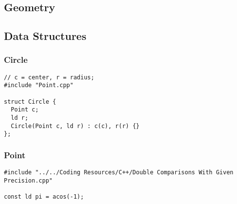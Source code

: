 \documentclass[twoside]{article}
\begin{document}
\begin{multicols*}{2}
\sectionfont{\bfseries\sffamily\centering\Huge}
\vspace{1em}
\section*{Geometry}
\vspace{3em}
\subsectionfont{\bfseries\sffamily\centering\LARGE}
\vspace{0em}
\subsection*{Data Structures}
\vspace{2em}
\subsubsectionfont{\large\bfseries\sffamily\underline}
\subsubsection*{Circle}
\begin{verbatim}
// c = center, r = radius;
#include "Point.cpp"

struct Circle {
  Point c;
  ld r;
  Circle(Point c, ld r) : c(c), r(r) {}
};
\end{verbatim}

\subsubsectionfont{\large\bfseries\sffamily\underline}
\subsubsection*{Point}
\begin{verbatim}
#include "../../Coding Resources/C++/Double Comparisons With Given Precision.cpp"

const ld pi = acos(-1);


\end{verbatim}
\end{multicols*}
\end{document}
